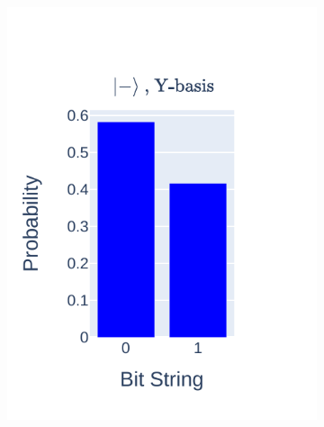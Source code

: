 \documentclass[journal]{IEEEtran}
\begin{document}
\begin{figure}
\begin{subfigure}{0.2\textwidth}
        \includegraphics[scale=0.8, trim={35 20 10 25}, clip]{figures/state_teleport/minus_y_results.pdf}
    \end{subfigure}
    \begin{subfigure}{0.2\textwidth}
        \centering

\end{subfigure}
\end{figure}
\end{document}
